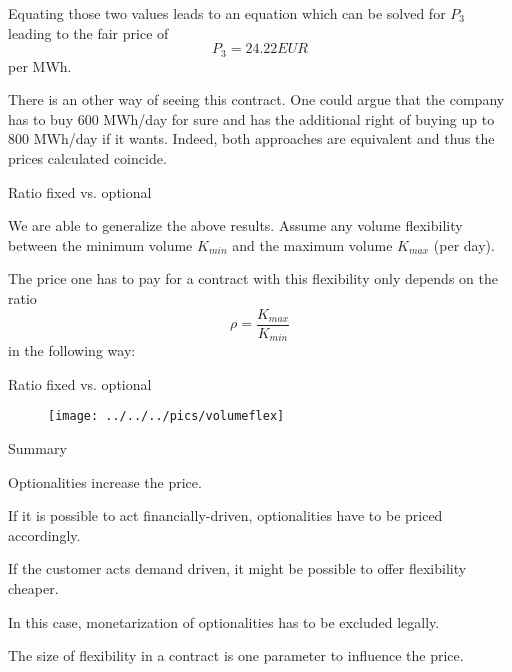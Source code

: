 	Equating those two values leads to an equation which can be solved for $P_3$ leading to the fair price of
$$
	P_3 = 24.22 EUR
$$
per MWh.


	
There is an other way of seeing this contract. One could argue that the company has to buy 600 MWh/day for sure and has the additional right of buying up to 800 MWh/day if it wants. Indeed, both approaches are equivalent and thus the prices calculated coincide.






{Ratio fixed vs. optional}






	We are able to generalize the above results. Assume any volume flexibility between the minimum volume $K_{min}$ and the maximum volume $K_{max}$ (per day).


	The price one has to pay for a contract with this flexibility only depends on the ratio
$$
	\rho = \frac{K_{max}}{K_{min}}
$$
in the following way:





{Ratio fixed vs. optional}
\begin{figure}
	\centering
		\texttt{[image: ../../../pics/volumeflex]}
	\label{fig:volumeflex}
\end{figure}

{Summary}






	Optionalities increase the price.


	If it is possible to act financially-driven, optionalities have to be priced accordingly.


	If the customer acts demand driven, it might be possible to offer flexibility cheaper.


	In this case, monetarization of optionalities has to be excluded legally.


	The size of flexibility in a contract is one parameter to influence the price.






